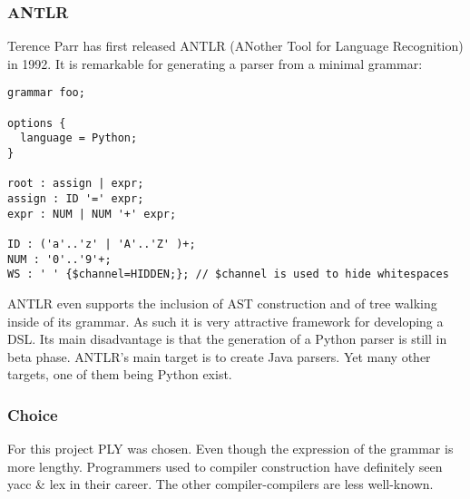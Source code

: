 \documentclass{scrartcl}
\begin{document}
\subsubsection{ANTLR}
\label{subsub:antlr}
Terence Parr has first released ANTLR (ANother Tool for Language Recognition)
in 1992. It is remarkable for generating a parser from a minimal grammar:
\begin{lstlisting}[frame=tb, caption=ANTLR grammar]
grammar foo;

options {
  language = Python;
}

root : assign | expr;
assign : ID '=' expr;
expr : NUM | NUM '+' expr;

ID : ('a'..'z' | 'A'..'Z' )+;
NUM : '0'..'9'+;
WS : ' ' {$channel=HIDDEN;}; // $channel is used to hide whitespaces
\end{lstlisting}

ANTLR even supports the inclusion of AST construction and of tree walking
inside of its grammar. As such it is very attractive framework for developing
a DSL\@. Its main disadvantage is that the generation of a Python parser is still
in beta phase. ANTLR's main target is to create Java parsers. Yet many other
targets, one of them being Python exist.

\subsubsection{Choice}
\label{subsub:choice}
For this project PLY was chosen. Even though the expression of the grammar is
more lengthy. Programmers used to compiler construction have definitely seen yacc \& lex in their career. The other compiler-compilers are less well-known.



\end{document}
